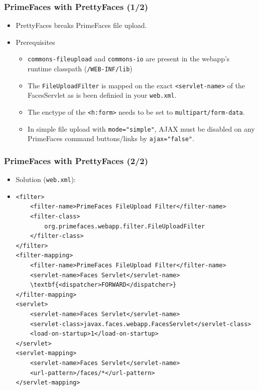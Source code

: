 \documentclass[10pt,xcolor=pdflatex]{beamer}
\begin{document}
\begin{frame}[containsverbatim]\frametitle{PrimeFaces with PrettyFaces (1/2)}
  \begin{itemize}
    \item PrettyFaces breaks PrimeFaces file upload.
    \item Prerequisites
      \begin{itemize}
        \item \texttt{commons-fileupload} and \texttt{commons-io} are present in the webapp’s runtime classpath (\texttt{/WEB-INF/lib})
        \item The \texttt{FileUploadFilter} is mapped on the exact \texttt{<servlet-name>} of the FacesServlet as is been definied in your \texttt{web.xml}.
        \item The enctype of the \texttt{<h:form>} needs to be set to \texttt{multipart/form-data}.
        \item In simple file upload with \texttt{mode="simple"}, AJAX must be disabled on any PrimeFaces command buttons/links by \texttt{ajax="false"}.
      \end{itemize}
  \end{itemize}
\end{frame}
  
  
\begin{frame}[containsverbatim]\frametitle{PrimeFaces with PrettyFaces (2/2)}
  \begin{itemize}
    \item Solution (\texttt{web.xml}):
    \renewcommand{\ttdefault}{txtt}
    \item[] \begin{footnotesize}
      \begin{Verbatim}[commandchars=\\\{\}]
<filter>
    <filter-name>PrimeFaces FileUpload Filter</filter-name>
    <filter-class>
        org.primefaces.webapp.filter.FileUploadFilter
    </filter-class>
</filter>
<filter-mapping>
    <filter-name>PrimeFaces FileUpload Filter</filter-name>
    <servlet-name>Faces Servlet</servlet-name>
    \textbf{<dispatcher>FORWARD</dispatcher>}
</filter-mapping>
<servlet>
    <servlet-name>Faces Servlet</servlet-name>
    <servlet-class>javax.faces.webapp.FacesServlet</servlet-class>
    <load-on-startup>1</load-on-startup>
</servlet>
<servlet-mapping>
    <servlet-name>Faces Servlet</servlet-name>
    <url-pattern>/faces/*</url-pattern>
</servlet-mapping>
      \end{Verbatim}
      \end{footnotesize}
  \end{itemize}
\end{frame}
\end{document}
